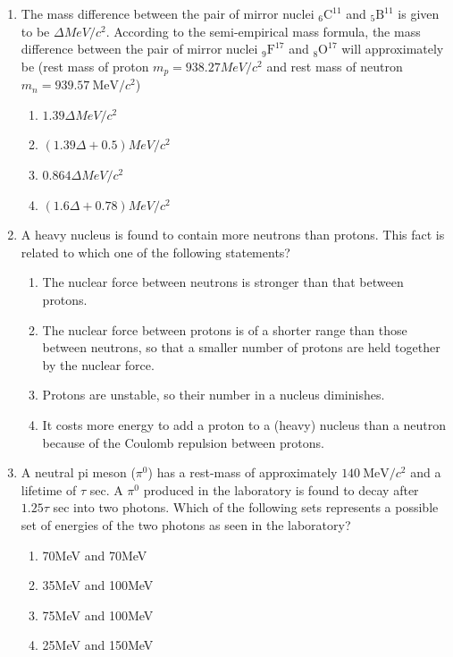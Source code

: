 \documentclass[journal,12pt,onecolumn]{IEEEtran}
\theoremstyle{remark}
\begin{document}
\begin{enumerate}
\item The mass difference between the pair of mirror nuclei $_{6}\mathrm{C}^{11}$ and $_{5}\mathrm{B}^{11}$ is given to be $\Delta{MeV}/c^2$. According to the semi-empirical mass formula, the mass difference between the pair of mirror nuclei $_{9}\mathrm{F}^{17}$ and $_{8}\mathrm{O}^{17}$ will approximately be (rest mass of proton $m_p=938.27{MeV}/c^2$ and rest mass of neutron $m_n=939.57\ \mathrm{MeV}/c^2$)
\hfill{}
\begin{multicols}{2}
\begin{enumerate}
    \item $1.39\Delta{MeV}/c^2$
    \item $(1.39\Delta + 0.5){MeV}/c^2$
    \item $0.864\Delta{MeV}/c^2$
    \item $(1.6\Delta + 0.78){MeV}/c^2$
\end{enumerate}
\end{multicols}

\item A heavy nucleus is found to contain more neutrons than protons.  This fact is related to which one of the following statements?
\hfill{}
\begin{enumerate}
    \item The nuclear force between neutrons is stronger than that between protons.
    \item The nuclear force between protons is of a shorter range than those between neutrons, so that a smaller number of protons are held together by the nuclear force.
    \item Protons are unstable, so their number in a nucleus diminishes.
    \item It costs more energy to add a proton to a (heavy) nucleus than a neutron because of the Coulomb repulsion between protons.
\end{enumerate}


\item A neutral pi meson ($\pi^0$) has a rest-mass of approximately $140\ \mathrm{MeV}/c^2$ and a lifetime of $\tau$ sec. A $\pi^0$ produced in the laboratory is found to decay after $1.25\tau$ sec into two photons. Which of the following sets represents a possible set of energies of the two photons as seen in the laboratory?
\hfill{}
\begin{multicols}{2}
\begin{enumerate}
    \item 70MeV and 70MeV                                                \item 35MeV and 100MeV
    \item 75MeV and 100MeV
    \item 25MeV and 150MeV
\end{enumerate}
\end{multicols}


\end{enumerate}
\end{document}
